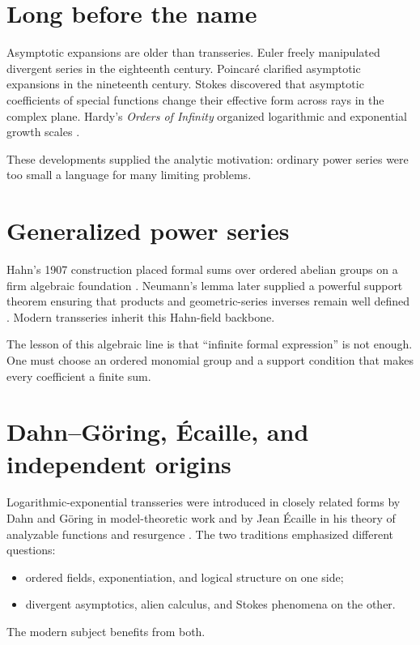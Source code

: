 \documentclass[11pt,oneside]{book}
\theoremstyle{definition}
\theoremstyle{remark}
\begin{document}
\section{Long before the name}

Asymptotic expansions are older than transseries. Euler freely manipulated
divergent series in the eighteenth century. Poincar\'e clarified asymptotic
expansions in the nineteenth century. Stokes discovered that asymptotic
coefficients of special functions change their effective form across rays in
the complex plane. Hardy's \emph{Orders of Infinity} organized logarithmic and
exponential growth scales \cite{HardyOrders}.

These developments supplied the analytic motivation: ordinary power series were
too small a language for many limiting problems.

\section{Generalized power series}

Hahn's 1907 construction placed formal sums over ordered abelian groups on a
firm algebraic foundation \cite{Hahn1907}. Neumann's lemma later supplied a
powerful support theorem ensuring that products and geometric-series inverses
remain well defined \cite{Neumann1949}. Modern transseries inherit this Hahn-field
backbone.

The lesson of this algebraic line is that ``infinite formal expression'' is not
enough. One must choose an ordered monomial group and a support condition that
makes every coefficient a finite sum.

\section{Dahn--G\"oring, \'Ecaille, and independent origins}

Logarithmic-exponential transseries were introduced in closely related forms by
Dahn and G\"oring in model-theoretic work and by Jean \'Ecaille in his theory of
analyzable functions and resurgence \cite{DahnGoring,EcalleAnalyzable}. The two
traditions emphasized different questions:
\begin{itemize}
\item ordered fields, exponentiation, and logical structure on one side;
\item divergent asymptotics, alien calculus, and Stokes phenomena on the other.
\end{itemize}
The modern subject benefits from both.
\end{document}
